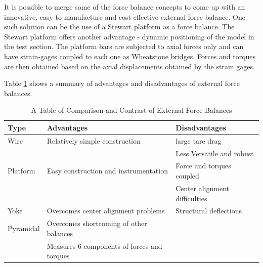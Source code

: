 It is possible to merge some of the force balance concepts to come up with an innovative, easy-to-manufacture and cost-effective external force balance. One such solution can be the use of a Stewart platform as a force balance. The Stewart platform offers another advantage - dynamic positioning of the model in the test section.
The platform bars are subjected to axial forces only and can have strain-gages coupled to each one as Wheatstone bridges. Forces and torques are then obtained based on the axial displacements obtained by the strain gages\cite{fernandes_design_nodate}.

Table \ref{tablecom} shows a summary of advantages and disadvantages of external force balances.
\clearpage
\begin{center}
	\begin{table}[H]
		\caption[Comparison of Force Balances]{A Table of Comparison and Contrast of External Force Balances}
		\label{tablecom}
	
	\begin{tabular}{|l|l|l|}
		\hline
		\textbf{Type} & \textbf{Advantages}                         & \textbf{Disadvantages}        \\
		\hline
		Wire          & Relatively simple construction              & large tare drag               \\
		              &                                             & Less Versatile and robust     \\
		\hline
		Platform      & Easy construction and instrumentation        & Force and torques coupled     \\
		              &                                             & Center alignment difficulties \\
		\hline
		Yoke          & Overcomes center alignment problems         & Structural deflections        \\
		\hline
		Pyramidal     & Overcomes shortcoming of other balances     &                               \\
		              & Measures 6 components of forces and torques &                               \\
		\hline
	\end{tabular}
\end{table}
\end{center}
